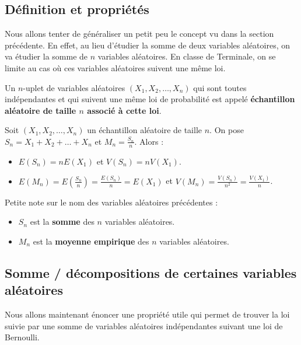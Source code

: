 	\subsection{Définition et propriétés}
	
	Nous allons tenter de généraliser un petit peu le concept vu dans la section précédente. En effet, au lieu d'étudier la somme de deux variables aléatoires, on va étudier la somme de $n$ variables aléatoires.
	\newpar
	En classe de Terminale, on se limite au cas où ces variables aléatoires suivent une même loi.
	
	\begin{formula}
		Un $n$-uplet de variables aléatoires $(X_1, X_2, \dots, X_n)$ qui sont toutes indépendantes et qui suivent une même loi de probabilité est appelé \textbf{échantillon aléatoire de taille $n$ associé à cette loi}.
	\end{formula}
	
	\begin{formula}
		Soit $(X_1, X_2, \dots, X_n)$ un échantillon aléatoire de taille $n$. On pose $S_n = X_1 + X_2 + \dots + X_n$ et $M_n = \frac{S_n}{n}$. Alors :
		\begin{itemize}
			\item $E(S_n) = nE(X_1)$ et $V(S_n) = nV(X_1)$.
			\item $E(M_n) = E\left(\frac{S_n}{n}\right) = \frac{E(S_n)}{n} = E(X_1)$ et $V(M_n) = \frac{V(S_n)}{n^2} = \frac{V(X_1)}{n}$.
		\end{itemize}
	\end{formula}
	
	\begin{tip}[Note]
		Petite note sur le nom des variables aléatoires précédentes :
		\begin{itemize}
			\item $S_n$ est la \textbf{somme} des $n$ variables aléatoires.
			\item $M_n$ est la \textbf{moyenne empirique} des $n$ variables aléatoires.
		\end{itemize}
	\end{tip}
	
	\subsection{Somme / décompositions de certaines variables aléatoires}
	
	Nous allons maintenant énoncer une propriété utile qui permet de trouver la loi suivie par une somme de variables aléatoires indépendantes suivant une loi de Bernoulli.
	

